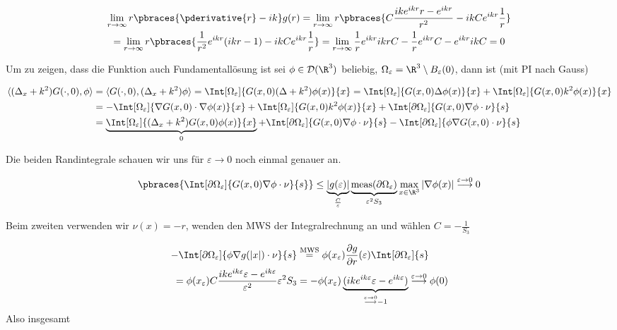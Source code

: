\begin{solution}
\begin{multline*}
  \lim_{r \to \infty} r \pbraces{\pderivative{r} - i k} g(r)
  =
  \lim_{r \to \infty} r \pbraces{C \frac{ik e^{ikr}r - e^{ikr}}{r^2} - ikC e^{ikr} \frac{1}{r}} \\
  =
  \lim_{r \to \infty} r \pbraces{\frac{1}{r^2} e^{ikr}(ikr - 1) - ikC e^{ikr} \frac{1}{r}}
  =
  \lim_{r \to \infty} \frac{1}{r} e^{ikr}ikr C - \frac{1}{r}e^{ikr}C - e^{ikr}ik C
  =
  0
\end{multline*}

Um zu zeigen, dass die Funktion auch Fundamentallösung ist sei $\phi \in \mathcal{D}(\R^3)$ beliebig, $\Omega_\varepsilon = \R^3 \setminus B_\varepsilon(0)$, dann ist (mit PI nach Gauss)

\begin{align*}
  \langle (\Delta_x + k^2)G(\cdot, 0), \phi \rangle
  &=
  \langle G(\cdot, 0), (\Delta_x + k^2) \phi \rangle
  =
  \Int[\Omega_\varepsilon]{G(x, 0) (\Delta + k^2) \phi(x)}{x}
  =
  \Int[\Omega_\varepsilon]{G(x, 0) \Delta \phi(x)}{x} + \Int[\Omega_\varepsilon]{G(x, 0)k^2 \phi(x)}{x} \\
  &=
  -\Int[\Omega_\varepsilon]{\nabla G(x, 0) \cdot \nabla \phi(x)}{x}
    + \Int[\Omega_\varepsilon]{G(x, 0)k^2 \phi(x)}{x}
    + \Int[\partial \Omega_\varepsilon]{G(x,0) \nabla \phi \cdot \nu}{s} \\
  &=
  \underbrace{\Int[\Omega_\varepsilon]{(\Delta_x + k^2)G(x, 0) \phi(x)}{x}}_0
    + \Int[\partial \Omega_\varepsilon]{G(x,0) \nabla \phi \cdot \nu}{s}
    - \Int[\partial \Omega_\varepsilon]{\phi \nabla G(x,0) \cdot \nu}{s} \\
\end{align*}

Die beiden Randintegrale schauen wir uns für $\varepsilon \rightarrow 0$ noch einmal genauer an.

\begin{align*}
  \pbraces{\Int[\partial \Omega_\varepsilon]{G(x,0) \nabla \phi \cdot \nu}{s}}
  \leq
  \underbrace{|g(\varepsilon)|}_{\frac{C}{\varepsilon}} \underbrace{\text{meas}(\partial \Omega_\varepsilon)}_{\varepsilon^2 S_3} \max_{x \in \R^3}|\nabla \phi(x)|
  \stackrel{\varepsilon \to 0}{\longrightarrow}
  0
\end{align*}

Beim zweiten verwenden wir $\nu(x) = - r$, wenden den MWS der Integralrechnung an und wählen $C = -\frac{1}{S_3}$

\begin{align*}
  - \Int[\partial \Omega_\varepsilon]{\phi \nabla g(|x|) \cdot \nu}{s}
  &\stackrel{\text{MWS}}{=}
  \phi(x_\varepsilon) \frac{\partial g}{\partial r}(\varepsilon) \Int[\partial \Omega_\varepsilon]{s} \\
  =
  \phi(x_\varepsilon) C \frac{ik e^{ik\varepsilon}\varepsilon - e^{ik\varepsilon}}{\varepsilon^2} \varepsilon^2 S_3
  &=
  -\phi(x_\varepsilon) \underbrace{(ik e^{ik\varepsilon}\varepsilon - e^{ik\varepsilon})}_{\stackrel{\varepsilon \to 0}{\longrightarrow} -1}
  \stackrel{\varepsilon \to 0}{\longrightarrow}
  \phi(0)
\end{align*}
Also insgesamt


\end{solution}
